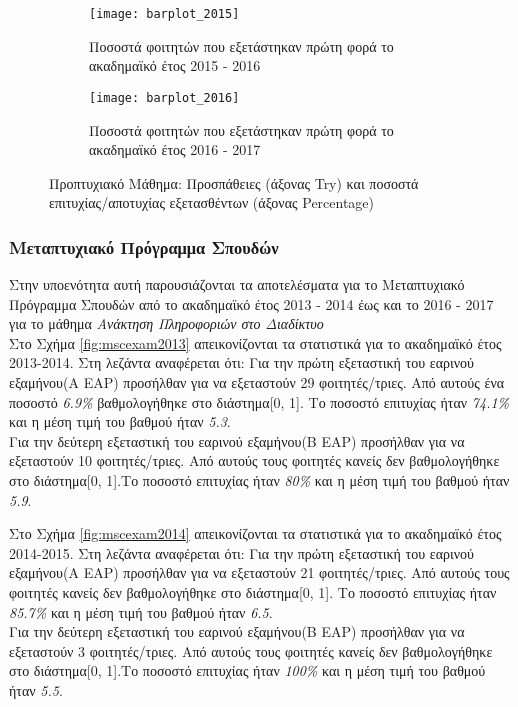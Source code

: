 \documentclass[12pt,a4paper,final]{article}
\begin{document}
\begin{figure}[h]
	\centering
	\begin{subfigure}[b]{0.475\textwidth}
		\centering
		\texttt{[image: barplot\_2015]}
		\caption{Ποσοστά φοιτητών που εξετάστηκαν πρώτη  φορά το ακαδημαϊκό έτος  2015 - 2016}
		\label{fig:barplot_2015}
	\end{subfigure}
	\hfill
	\begin{subfigure}[b]{0.475\textwidth}
		\centering
		\texttt{[image: barplot\_2016]}
		\caption{Ποσοστά φοιτητών που εξετάστηκαν πρώτη φορά το ακαδημαϊκό έτος  2016 - 2017}
		\label{fig:barplot_2016}
	\end{subfigure}
	\caption{Προπτυχιακό Μάθημα: Προσπάθειες (άξονας \foreignlanguage{english}{Try}) και ποσοστά επιτυχίας/αποτυχίας εξετασθέντων (άξονας \foreignlanguage{english}{Percentage})}
	\label{fig:postBarpl}
\end{figure}
\clearpage

\subsubsection{Μεταπτυχιακό Πρόγραμμα Σπουδών}
Στην υποενότητα αυτή παρουσιάζονται  τα αποτελέσματα για το Μεταπτυχιακό Πρόγραμμα Σπουδών από το ακαδημαϊκό έτος 2013 - 2014 έως και το 2016 - 2017 για το μάθημα \textit{Ανάκτηση Πληροφοριών στο Διαδίκτυο}\\

Στο Σχήμα \ref{fig:mscexam2013} απεικονίζονται τα στατιστικά  για το ακαδημαϊκό έτος 2013-2014. Στη λεζάντα  αναφέρεται ότι: Για την πρώτη εξεταστική του εαρινού εξαμήνου(Α ΕΑΡ) προσήλθαν  για να εξεταστούν 29 φοιτητές/τριες.
Από αυτούς ένα ποσοστό \textit{6.9\%} βαθμολογήθηκε στο διάστημα[0, 1].
Το ποσοστό επιτυχίας ήταν \textit{74.1\%} και η μέση τιμή του βαθμού ήταν \textit{5.3}.\\
Για την δεύτερη  εξεταστική του εαρινού εξαμήνου(Β ΕΑΡ) προσήλθαν για να εξεταστούν 10
φοιτητές/τριες. Από αυτούς τους φοιτητές κανείς δεν βαθμολογήθηκε στο διάστημα[0, 1].Το ποσοστό επιτυχίας ήταν \textit{80\%} και η μέση τιμή του βαθμού ήταν \textit{5.9}.\medskip

Στο Σχήμα \ref{fig:mscexam2014} απεικονίζονται τα στατιστικά  για το ακαδημαϊκό έτος 2014-2015. Στη λεζάντα  αναφέρεται ότι: Για την πρώτη εξεταστική του εαρινού εξαμήνου(Α ΕΑΡ) προσήλθαν  για να εξεταστούν 21 φοιτητές/τριες.
Από αυτούς τους φοιτητές κανείς δεν βαθμολογήθηκε στο διάστημα[0, 1].
Το ποσοστό επιτυχίας ήταν \textit{85.7\%} και η μέση τιμή του βαθμού ήταν \textit{6.5}.\\
Για την δεύτερη  εξεταστική του εαρινού εξαμήνου(Β ΕΑΡ) προσήλθαν για να εξεταστούν 3
φοιτητές/τριες. Από αυτούς τους φοιτητές κανείς δεν βαθμολογήθηκε στο διάστημα[0, 1].Το ποσοστό επιτυχίας ήταν \textit{100\%} και η μέση τιμή του βαθμού ήταν \textit{5.5}.\medskip
\end{document}
